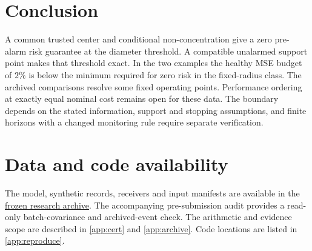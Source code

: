 \documentclass[preprint,11pt]{elsarticle}
\begin{document}




\section{Conclusion}

A common trusted center and conditional non-concentration give a zero pre-alarm risk guarantee at the diameter threshold. A compatible unalarmed support point makes that threshold exact. In the two examples the healthy MSE budget of \(2\%\) is below the minimum required for zero risk in the fixed-radius class. The archived comparisons resolve some fixed operating points. Performance ordering at exactly equal nominal cost remains open for these data. The boundary depends on the stated information, support and stopping assumptions, and finite horizons with a changed monitoring rule require separate verification.

\section*{Data and code availability}

The model, synthetic records, receivers and input manifests are available in the
\href{https://github.com/center-666/paperlast/tree/b1509be0265ecd0512befe999847fa5908087872}{frozen research archive}.
The accompanying pre-submission audit provides a read-only batch-covariance and archived-event check. The arithmetic and evidence scope are described in \ref{app:cert} and \ref{app:archive}. Code locations are listed in \ref{app:reproduce}.

\appendix


\end{document}
